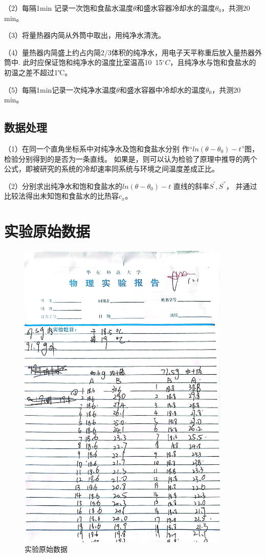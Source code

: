 \documentclass{ctexart}
\begin{document}
  （2）每隔1min 记录一次饱和食盐水温度$\theta$和盛水容器冷却水的温度$\theta_{0}$，共测20 min。

  （3）将量热器内简从外筒中取出，用纯净水清洗。

  （4）量热器内简盛上约占内简2/3体积的纯净水，用电子天平称重后放入量热器外筒中.
  此时应保证饱和纯净水的温度比室温高10~15$^{\circ}C$，且纯净水与饱和食盐水的初温之差不超过1℃。

  （5）每隔1min记录一次纯净水温度$\theta$和盛水容器中冷却水的温度$\theta_{0}$，共测20 min。

  \subsection{数据处理}
  （1）在同一个直角坐标系中对纯净水及饱和食盐水分别
  作“$ln(\theta - \theta_{0}) - t$”图，
  检验分别得到的是否为一条直线。
  如果是，则可以认为检验了原理中推导的两个公式，即被研究的系统的冷却速率同系统与环境之间温度差成正比。

  （2）分别求出纯净水和饱和食盐水的$ln(\theta - \theta_{0}) - t$ 直线的斜率$S^{'} , S^{''}$，
  并通过比较法得出未知饱和食盐水的比热容$c_{x}$。
\newpage

\section{实验原始数据}
\begin{figure}[H]
  \centering
  \includegraphics[width=0.9\textwidth,height=0.8\textheight]{yuanshishujv.jpg}
  \caption{实验原始数据}
\end{figure}
\newpage
\end{document}
